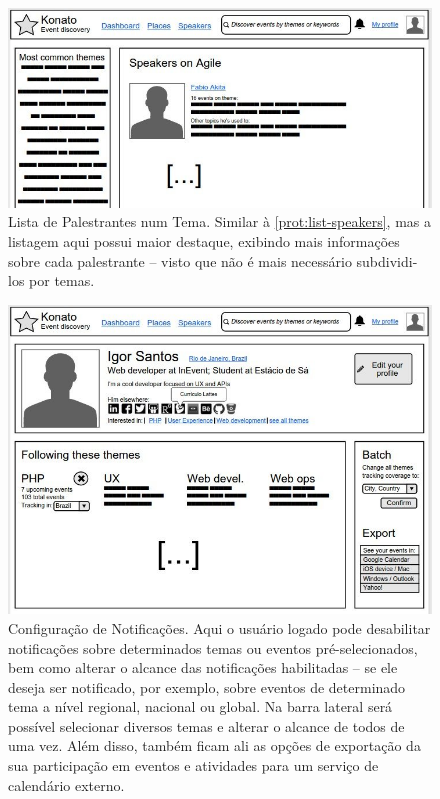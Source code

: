 \documentclass[12pt,a4paper,twoside,hyphens,english,brazil]{abntex2}
\begin{document}
{\begin{figure}[h]
\centering
	\includegraphics[width=1\linewidth]{imagens/prototipos/1-5-1_Speakers_in_theme.jpg}
	\caption[Lista de Palestrantes num Tema]{Lista de Palestrantes num Tema. Similar à \ref{prot:list-speakers}, mas a listagem aqui possui maior destaque, exibindo mais informações sobre cada palestrante -- visto que não é mais necessário subdividi-los por temas.}
	\label{prot:list-speakers-theme}
\end{figure}

\begin{figure}[h]
\centering
	\includegraphics[width=1\linewidth]{imagens/prototipos/1-6-2_Notification_preferences.jpg}
	\caption[Configuração de Notificações]{Configuração de Notificações. Aqui o usuário logado pode desabilitar notificações sobre determinados temas ou eventos pré-selecionados, bem como alterar o alcance das notificações habilitadas -- se ele deseja ser notificado, por exemplo, sobre eventos de determinado tema a nível regional, nacional ou global. Na barra lateral será possível selecionar diversos temas e alterar o alcance de todos de uma vez. Além disso, também ficam ali as opções de exportação da sua participação em eventos e atividades para um serviço de calendário externo.}
	\label{prot:list-notification-prefs}
\end{figure}

}
\end{document}
